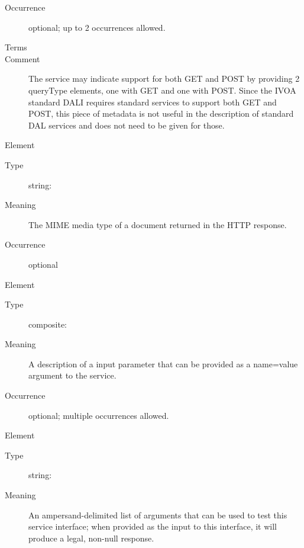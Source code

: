 \documentclass[11pt,a4paper]{ivoa}
\begin{document}
\begin{generated}
\begin{bigdescription}
\begin{description}
\item[Occurrence] optional; up to 2 occurrences allowed.

\item[Terms]\hfil
\begin{longtermsdescription}
\item[GET]
\item[POST]
\end{longtermsdescription}
\item[Comment]
                       The service may indicate support for both GET
                       and POST by providing 2 queryType elements, one
                       with GET and one with POST.  Since the IVOA standard
                       DALI requires standard services to support both
                       GET and POST, this piece of metadata is not
                       useful in the description of standard DAL services
                       and does not need to be given for those.


\end{description}
\item[Element \xmlel{resultType}]
\begin{description}
\item[Type] string: 
\item[Meaning]
                       The MIME media type of a document returned in
                       the HTTP response.

\item[Occurrence] optional

\end{description}
\item[Element \xmlel{param}]
\begin{description}
\item[Type] composite: 
\item[Meaning]
                       A description of a input parameter that can be
                       provided as a name=value argument to the service.

\item[Occurrence] optional; multiple occurrences allowed.

\end{description}
\item[Element \xmlel{testQuery}]
\begin{description}
\item[Type] string: 
\item[Meaning]
                       An ampersand-delimited list of arguments that
                       can be used to test this service interface;
                       when provided as the input to this interface,
                       it will produce a legal, non-null response.


\end{description}
\end{bigdescription}
\end{generated}
\end{document}
